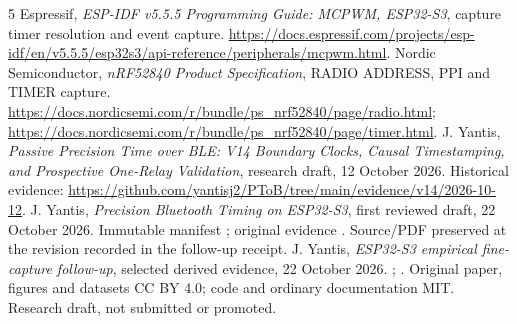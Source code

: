 \documentclass[10pt,letterpaper]{article}
\begin{document}
\begin{thebibliography}{5}\small\setlength{\itemsep}{2pt}
 Espressif, \emph{ESP-IDF v5.5.5 Programming Guide: MCPWM, ESP32-S3}, capture timer resolution and event capture. \url{https://docs.espressif.com/projects/esp-idf/en/v5.5.5/esp32s3/api-reference/peripherals/mcpwm.html}.
 Nordic Semiconductor, \emph{nRF52840 Product Specification}, RADIO ADDRESS, PPI and TIMER capture. \url{https://docs.nordicsemi.com/r/bundle/ps_nrf52840/page/radio.html}; \url{https://docs.nordicsemi.com/r/bundle/ps_nrf52840/page/timer.html}.
 J. Yantis, \emph{Passive Precision Time over BLE: V14 Boundary Clocks, Causal Timestamping, and Prospective One-Relay Validation}, research draft, 12 October 2026. Historical evidence: \url{https://github.com/yantisj2/PToB/tree/main/evidence/v14/2026-10-12}.
 J. Yantis, \emph{Precision Bluetooth Timing on ESP32-S3}, first reviewed draft, 22 October 2026. Immutable manifest ; original evidence . Source/PDF preserved at the revision recorded in the follow-up receipt.
 J. Yantis, \emph{ESP32-S3 empirical fine-capture follow-up}, selected derived evidence, 22 October 2026. ; . Original paper, figures and datasets CC BY 4.0; code and ordinary documentation MIT. Research draft, not submitted or promoted.
\end{thebibliography}
\end{document}
